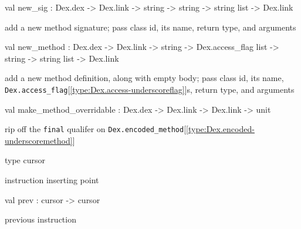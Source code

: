 \documentclass[11pt]{article}
\begin{document}
\label{val:Modify.new-underscoresig}\begin{ocamldoccode}
val new_sig :
  Dex.dex -> Dex.link -> string -> string -> string list -> Dex.link
\end{ocamldoccode}
\begin{ocamldocdescription}
add a new method signature;
 pass class id, its name, return type, and arguments


\end{ocamldocdescription}




\label{val:Modify.new-underscoremethod}\begin{ocamldoccode}
val new_method :
  Dex.dex ->
  Dex.link ->
  string -> Dex.access_flag list -> string -> string list -> Dex.link
\end{ocamldoccode}
\begin{ocamldocdescription}
add a new method definition, along with empty body;
 pass class id, its name, {\tt{Dex.access\_flag}}[\ref{type:Dex.access-underscoreflag}]s, return type, and arguments


\end{ocamldocdescription}




\label{val:Modify.make-underscoremethod-underscoreoverridable}\begin{ocamldoccode}
val make_method_overridable : Dex.dex -> Dex.link -> Dex.link -> unit
\end{ocamldoccode}
\begin{ocamldocdescription}
rip off the {\tt{final}} qualifer on {\tt{Dex.encoded\_method}}[\ref{type:Dex.encoded-underscoremethod}]


\end{ocamldocdescription}




\label{type:Modify.cursor}\begin{ocamldoccode}
type cursor 
\end{ocamldoccode}
\begin{ocamldocdescription}
instruction inserting point


\end{ocamldocdescription}




\label{val:Modify.prev}\begin{ocamldoccode}
val prev : cursor -> cursor
\end{ocamldoccode}
\begin{ocamldocdescription}
previous instruction


\end{ocamldocdescription}
\end{document}
